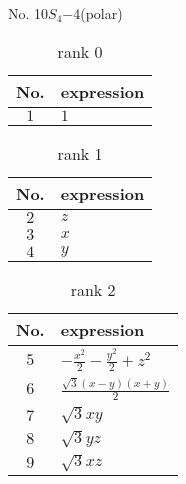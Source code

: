 \documentclass[fleqn,8pt,landscape]{jsarticle}
\begin{document}
\setcounter{MaxMatrixCols}{16}

\begin{center}
\LARGE
No. 10\quad$S_{4}$\quad$-4$\quad[ tetragonal ] (polar)
\end{center}
\begin{table}[ht!]
\begin{center}
\caption{rank 0}
\renewcommand{\arraystretch}{1.3}
\begin{tabular}{cl} \hline \hline
No. & expression \\ \hline
$ 1 $ & $ 1 $ \\
 \hline \hline
\end{tabular}
\end{center}
\end{table}
\begin{table}[ht!]
\begin{center}
\caption{rank 1}
\renewcommand{\arraystretch}{1.3}
\begin{tabular}{cl} \hline \hline
No. & expression \\ \hline
$ 2 $ & $ z $ \\
$ 3 $ & $ x $ \\
$ 4 $ & $ y $ \\
 \hline \hline
\end{tabular}
\end{center}
\end{table}
\begin{table}[ht!]
\begin{center}
\caption{rank 2}
\renewcommand{\arraystretch}{1.3}
\begin{tabular}{cl} \hline \hline
No. & expression \\ \hline
$ 5 $ & $ - \frac{x^{2}}{2} - \frac{y^{2}}{2} + z^{2} $ \\
$ 6 $ & $ \frac{\sqrt{3} \left(x - y\right) \left(x + y\right)}{2} $ \\
$ 7 $ & $ \sqrt{3} x y $ \\
$ 8 $ & $ \sqrt{3} y z $ \\
$ 9 $ & $ \sqrt{3} x z $ \\
 \hline \hline
\end{tabular}
\end{center}
\end{table}
\end{document}
